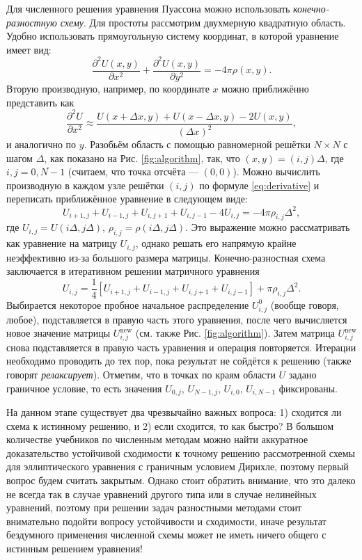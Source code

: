 \documentclass[12pt]{article}
\begin{document}
Для численного решения уравнения Пуассона можно использовать \textit{конечно-разностную схему}. Для простоты рассмотрим двухмерную квадратную область. Удобно использовать прямоугольную систему координат, в которой уравнение имеет вид:
%
\begin{equation} 
\frac{\partial^2 U(x,y)}{\partial x^2}+\frac{\partial^2 U(x,y)}{\partial y^2}=-4\pi\rho(x,y).
\label{eq:Poisson}
\end{equation}
%
Вторую производную, например, по координате $x$ можно приближённо представить как
%
\begin{equation}
\frac{\partial^2 U}{\partial x^2}\approx \frac{U(x+\Delta x,y)+U(x-\Delta x,y)-2U(x,y)}{(\Delta x)^2},
\label{eq:derivative}
\end{equation} 
%
и аналогично по $y$. Разобьём область с помощью равномерной решётки $N\times N$ с шагом $\Delta$, как показано на Рис. \ref{fig:algorithm}, так, что $(x,y)=(i,j)\Delta$, где $i,j=\overline{0,N-1}$ (считаем, что точка отсчёта --- $(0,0)$). Можно вычислить производную в каждом узле решётки $(i,j)$ по формуле \eqref{eq:derivative} и переписать приближённое уравнение в следующем виде:
%
\begin{equation}
U_{i+1,j}+U_{i-1,j}+U_{i,j+1}+U_{i,j-1}-4U_{i,j}=-4\pi\rho_{i,j}\Delta^2,
\end{equation}
%
где $U_{i,j}=U(i\Delta,j\Delta)$, $\rho_{i,j}=\rho(i\Delta,j\Delta)$. Это выражение можно рассматривать как уравнение на матрицу $U_{i,j}$, однако решать его напрямую крайне неэффективно из-за большого размера матрицы. Конечно-разностная схема заключается в итеративном решении матричного уравнения 
%
\begin{equation}
U_{i,j}=\frac{1}{4}\left[U_{i+1,j}+U_{i-1,j}+U_{i,j+1}+U_{i,j-1}\right]+\pi\rho_{i,j}\Delta^2.
\end{equation}
%
Выбирается некоторое пробное начальное распределение $U^0_{i,j}$ (вообще говоря, любое), подставляется в правую часть этого уравнения, после чего вычисляется новое значение матрицы $U^\text{new}_{i,j}$ (см. также Рис. \ref{fig:algorithm}). Затем матрица $U^\text{new}_{i,j}$ снова подставляется в правую часть уравнения и операция повторяется. Итерации необходимо проводить до тех пор, пока результат не сойдётся к решению (также говорят \textit{релаксирует}). Отметим, что в точках по краям области $U$ задано граничное условие, то есть значения $U_{0,j}$, $U_{N-1,j}$, $U_{i,0}$, $U_{i,N-1}$ фиксированы.

На данном этапе существует два чрезвычайно важных вопроса: 1) сходится ли схема к истинному решению, и 2) если сходится, то как быстро? В большом количестве учебников по численным методам можно найти аккуратное доказательство устойчивой сходимости к точному решению рассмотренной схемы для эллиптического уравнения с граничным условием Дирихле, поэтому первый вопрос будем считать закрытым. Однако стоит обратить внимание, что это далеко не всегда так в случае уравнений другого типа или в случае нелинейных уравнений, поэтому при решении задач разностными методами стоит внимательно подойти вопросу устойчивости и сходимости, иначе результат бездумного применения численной схемы может не иметь ничего общего с истинным решением уравнения!
\end{document}
